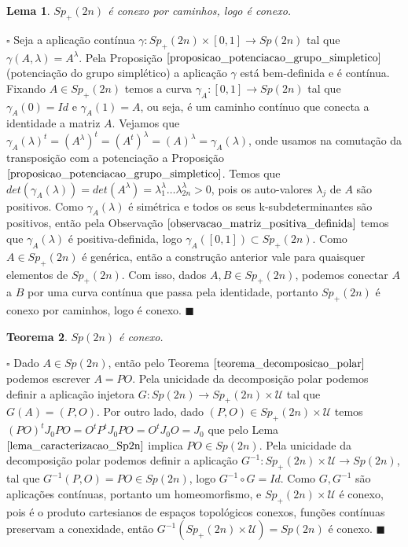 \documentclass[12pt]{book}
\newtheorem{teorema}{Teorema}[section]
\newtheorem{lema}[teorema]{Lema}
\newenvironment{prova}[1]{$\square$ #1}{\hfill$\blacksquare$}
\newcommand{\gruposimpletico}[1]{Sp(#1)}
\newcommand{\gruposimpleticopositivo}[1]{Sp_{+}(#1)}
\begin{document}
	\begin{lema}
		$\gruposimpleticopositivo{2n}$ é conexo por caminhos, logo é conexo.
	\end{lema}
	\begin{prova}
		Seja a aplicação contínua $\gamma:\gruposimpleticopositivo{2n}\times [0,1] \to \gruposimpletico{2n}$ tal que $\gamma(A,\lambda) = A^{\lambda}$. Pela Proposição $\ref{proposicao_potenciacao_grupo_simpletico}$ (potenciação do grupo simplético) a aplicação $\gamma$ está bem-definida e é contínua. Fixando $A \in \gruposimpleticopositivo{2n}$ temos a curva $\gamma_{A}:[0,1]\to \gruposimpletico{2n}$ tal que $\gamma_{A}(0) = Id$ e $\gamma_{A}(1) = A$, ou seja, é um caminho contínuo que conecta a identidade a matriz $A$. Vejamos que $\gamma_{A}(\lambda)^{t} = (A^{\lambda})^{t} = (A^{t})^{\lambda} = (A)^{\lambda} = \gamma_{A}(\lambda)$, onde usamos na comutação da transposição com a potenciação a Proposição $\ref{proposicao_potenciacao_grupo_simpletico}$. Temos que $det(\gamma_{A}(\lambda)) = det(A^{\lambda}) = \lambda_{1}^{\lambda}\dots\lambda_{2n}^{\lambda}>0$, pois os auto-valores $\lambda_{j}$ de $A$ são positivos. Como $\gamma_{A}(\lambda)$ é simétrica e todos os seus k-subdeterminantes são positivos, então pela Observação $\ref{observacao_matriz_positiva_definida}$ temos que $\gamma_{A}(\lambda)$ é positiva-definida, logo $\gamma_{A}([0,1]) \subset \gruposimpleticopositivo{2n}$. Como $A \in \gruposimpleticopositivo{2n}$ é genérica, então a construção anterior vale para quaisquer elementos de $\gruposimpleticopositivo{2n}$. Com isso, dados $A, B \in \gruposimpleticopositivo{2n}$, podemos conectar $A$ a $B$ por uma curva contínua que passa pela identidade, portanto $\gruposimpleticopositivo{2n}$ é conexo por caminhos, logo é conexo.
	\end{prova}	
	
	\begin{teorema}\label{teoerma_sp2n_conexo}
		$\gruposimpletico{2n}$ é conexo.
	\end{teorema}
	\begin{prova}
		Dado $A \in \gruposimpletico{2n}$, então pelo Teorema $\ref{teorema_decomposicao_polar}$ podemos escrever $A=PO$. Pela unicidade da decomposição polar podemos definir a aplicação injetora $G: \gruposimpletico{2n} \to \gruposimpleticopositivo{2n} \times \mathcal{U}$ tal que $G(A) = (P,O)$. Por outro lado, dado $(P,O) \in \gruposimpleticopositivo{2n} \times \mathcal{U}$ temos $(PO)^{t}J_{0}PO = O^{t}P^{t}J_{0}PO = O^{t}J_{0}O = J_{0}$ que pelo Lema $\ref{lema_caracterizacao_Sp2n}$ implica $PO \in \gruposimpletico{2n}$. Pela unicidade da decomposição polar podemos definir a aplicação $G^{-1}:\gruposimpleticopositivo{2n}\times \mathcal{U} \to \gruposimpletico{2n}$, tal que $G^{-1}(P,O) = PO \in \gruposimpletico{2n}$, logo $G^{-1} \circ G =Id$. Como $G, G^{-1}$ são aplicações contínuas, portanto um homeomorfismo, e $\gruposimpleticopositivo{2n}\times \mathcal{U}$ é conexo, pois é o produto cartesianos de espaços topológicos conexos, funções contínuas preservam a conexidade, então $G^{-1}(\gruposimpleticopositivo{2n}\times \mathcal{U}) = \gruposimpletico{2n}$ é conexo.
	\end{prova}
	
\end{document}
